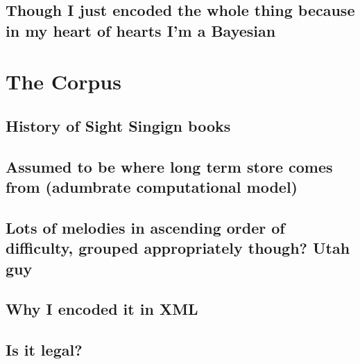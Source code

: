 \documentclass[]{book}
\theoremstyle{definition}
\theoremstyle{definition}
\theoremstyle{definition}
\theoremstyle{remark}
\begin{document}
\hypertarget{though-i-just-encoded-the-whole-thing-because-in-my-heart-of-hearts-im-a-bayesian}{%
\subsection{Though I just encoded the whole thing because in my heart of
hearts I'm a
Bayesian}\label{though-i-just-encoded-the-whole-thing-because-in-my-heart-of-hearts-im-a-bayesian}}

\hypertarget{the-corpus}{%
\section{The Corpus}\label{the-corpus}}

\hypertarget{history-of-sight-singign-books}{%
\subsection{History of Sight Singign
books}\label{history-of-sight-singign-books}}

\hypertarget{assumed-to-be-where-long-term-store-comes-from-adumbrate-computational-model}{%
\subsection{Assumed to be where long term store comes from (adumbrate
computational
model)}\label{assumed-to-be-where-long-term-store-comes-from-adumbrate-computational-model}}

\hypertarget{lots-of-melodies-in-ascending-order-of-difficulty-grouped-appropriately-though-utah-guy}{%
\subsection{Lots of melodies in ascending order of difficulty, grouped
appropriately though? Utah
guy}\label{lots-of-melodies-in-ascending-order-of-difficulty-grouped-appropriately-though-utah-guy}}

\hypertarget{why-i-encoded-it-in-xml}{%
\subsection{Why I encoded it in XML}\label{why-i-encoded-it-in-xml}}

\hypertarget{is-it-legal}{%
\subsection{Is it legal?}\label{is-it-legal}}
\end{document}
